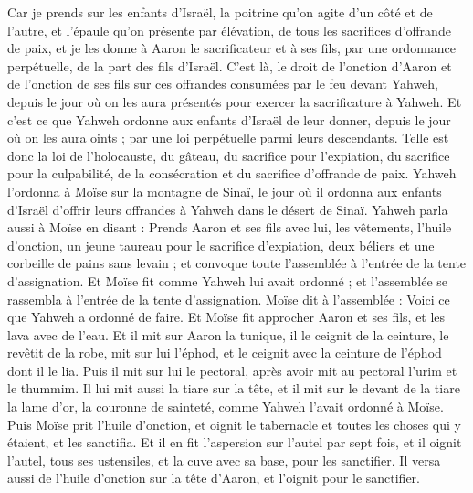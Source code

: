 \begin{multicols}{2}
Car je prends sur les enfants d'Israël, la poitrine qu'on agite d'un côté et de l'autre, et l'épaule qu'on présente par élévation, de tous les sacrifices d'offrande de paix, et je les donne à Aaron le sacrificateur et à ses fils, par une ordonnance perpétuelle, de la part des fils d'Israël.
C'est là, le droit de l'onction d'Aaron et de l'onction de ses fils sur ces offrandes consumées par le feu devant Yahweh, depuis le jour où on les aura présentés pour exercer la sacrificature à Yahweh.
Et c'est ce que Yahweh ordonne aux enfants d'Israël de leur donner, depuis le jour où on les aura oints ; par une loi perpétuelle parmi leurs descendants.
Telle est donc la loi de l'holocauste, du gâteau, du sacrifice pour l'expiation, du sacrifice pour la culpabilité, de la consécration et du sacrifice d'offrande de paix.
Yahweh l'ordonna à Moïse sur la montagne de Sinaï, le jour où il ordonna aux enfants d'Israël d'offrir leurs offrandes à Yahweh dans le désert de Sinaï.
\VerseOne{}Yahweh parla aussi à Moïse en disant :
Prends Aaron et ses fils avec lui, les vêtements, l'huile d'onction, un jeune taureau pour le sacrifice d'expiation, deux béliers et une corbeille de pains sans levain ;
et convoque toute l'assemblée à l'entrée de la tente d'assignation.
Et Moïse fit comme Yahweh lui avait ordonné ; et l'assemblée se rassembla à l'entrée de la tente d'assignation.
Moïse dit à l'assemblée : Voici ce que Yahweh a ordonné de faire.
Et Moïse fit approcher Aaron et ses fils, et les lava avec de l'eau.
Et il mit sur Aaron la tunique, il le ceignit de la ceinture, le revêtit de la robe, mit sur lui l'éphod, et le ceignit avec la ceinture de l'éphod dont il le lia.
Puis il mit sur lui le pectoral, après avoir mit au pectoral l'urim et le thummim.
Il lui mit aussi la tiare sur la tête, et il mit sur le devant de la tiare la lame d'or, la couronne de sainteté, comme Yahweh l'avait ordonné à Moïse.
Puis Moïse prit l'huile d'onction, et oignit le tabernacle et toutes les choses qui y étaient, et les sanctifia.
Et il en fit l'aspersion sur l'autel par sept fois, et il oignit l'autel, tous ses ustensiles, et la cuve avec sa base, pour les sanctifier.
Il versa aussi de l'huile d'onction sur la tête d'Aaron, et l'oignit pour le sanctifier.

\end{multicols}
